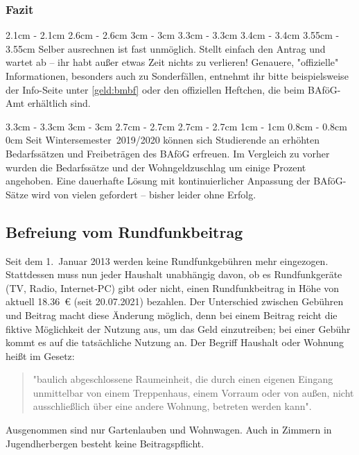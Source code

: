 \begin{multicols*}{2}
\subsubsection{Fazit}
2.1cm	\dimexpr\columnwidth - 2.1cm
2.6cm	\dimexpr\columnwidth - 2.6cm
3cm		\dimexpr\columnwidth - 3cm
3.3cm	\dimexpr\columnwidth - 3.3cm
3.4cm	\dimexpr\columnwidth - 3.4cm
3.55cm	\dimexpr\columnwidth - 3.55cm
Selber ausrechnen ist fast unmöglich.
Stellt einfach den Antrag und wartet ab -- ihr habt außer etwas Zeit nichts zu verlieren! Genauere, "offizielle" Informationen, besonders auch zu Sonderfällen, entnehmt ihr bitte beispielsweise der Info-Seite unter \cref{geld:bmbf} oder den offiziellen Heftchen, die beim BAföG-Amt erhältlich sind.

3.3cm	\dimexpr\columnwidth - 3.3cm
3cm		\dimexpr\columnwidth - 3cm
2.7cm	\dimexpr\columnwidth - 2.7cm
2.7cm	\dimexpr\columnwidth - 2.7cm
1cm		\dimexpr\columnwidth - 1cm
0.8cm	\dimexpr\columnwidth - 0.8cm
0cm \columnwidth
Seit Wintersemester~2019/2020 können sich Studierende an erhöhten Bedarfssätzen und Freibeträgen des BAföG erfreuen.
Im Vergleich zu vorher wurden die Bedarfssätze und der Wohngeldzuschlag um einige Prozent angehoben.
Eine dauerhafte Lösung mit kontinuierlicher Anpassung der BAföG-Sätze wird von vielen gefordert -- bisher leider ohne Erfolg.

\subsection{Befreiung vom Rundfunkbeitrag}
Seit dem 1.~Januar 2013 werden keine Rundfunkgebühren mehr eingezogen.
Stattdessen muss nun jeder Haushalt unabhängig davon, ob es Rundfunkgeräte (TV, Radio, Internet-PC) gibt oder nicht, einen Rundfunkbeitrag in Höhe von aktuell \SI{18,36}{\euro} (seit 20.07.2021) bezahlen.
Der Unterschied zwischen Gebühren und Beitrag macht diese Änderung möglich, denn bei einem Beitrag reicht die fiktive Möglichkeit der Nutzung aus, um das Geld einzutreiben; bei einer Gebühr kommt es auf die tatsächliche Nutzung an.
Der Begriff Haushalt oder Wohnung heißt im Gesetz:
\begin{quote}
	"baulich abgeschlossene Raumeinheit, die durch einen eigenen Eingang unmittelbar von einem Treppenhaus, einem Vorraum oder von außen, nicht ausschließlich über eine andere Wohnung, betreten werden kann".
\end{quote}
Ausgenommen sind nur Gartenlauben und Wohnwagen.
Auch in Zimmern in Jugendherbergen besteht keine Beitragspflicht.


\end{multicols*}
